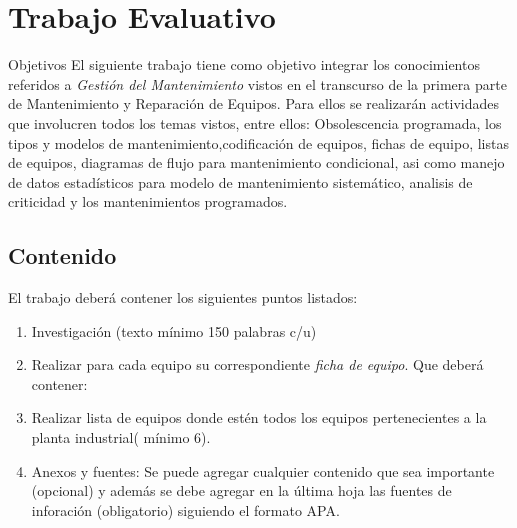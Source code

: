 \documentclass[../main]{subfiles}
\begin{document}
\section{Trabajo Evaluativo}


\begin{tcolorbox}[]
Objetivos
\tcblower
El siguiente trabajo tiene como objetivo integrar los conocimientos referidos a \emph{Gestión del Mantenimiento} vistos en el transcurso de la primera parte de Mantenimiento y Reparación de Equipos. Para ellos se realizarán actividades que involucren todos los temas vistos, entre ellos: Obsolescencia programada, los tipos y modelos de mantenimiento,codificación de equipos, fichas de equipo, listas de equipos, diagramas de flujo para mantenimiento condicional, asi como manejo de datos estadísticos para modelo de mantenimiento sistemático, analisis de criticidad y los mantenimientos programados.
\end{tcolorbox}

\subsection{Contenido}
El trabajo deberá contener los siguientes puntos listados:
\begin{enumerate}
    \item Investigación (texto mínimo 150 palabras c/u)
    \item Realizar para cada equipo su correspondiente \emph{ficha de equipo}. Que deberá contener:
    \item Realizar lista de equipos donde estén todos los equipos pertenecientes a la planta industrial( mínimo 6).
    \item Anexos y fuentes: Se puede agregar cualquier contenido que sea importante (opcional) y además se debe agregar en la última hoja las fuentes de inforación (obligatorio) siguiendo el formato APA.
\end{enumerate}
\end{document}
